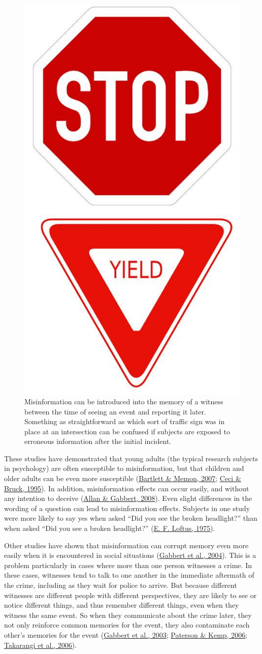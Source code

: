 \documentclass[
]{krantz}
\begin{document}
\begin{figure}

{\centering \includegraphics[width=0.3\linewidth]{images/ch6/fig2} 

}

\caption{Misinformation can be introduced into the memory of a witness between the time of seeing an event and reporting it later. Something as straightforward as which sort of traffic sign was in place at an intersection can be confused if subjects are exposed to erroneous information after the initial incident.}\label{fig:trafficsign}
\end{figure}

These studies have demonstrated that young adults (the typical research subjects in psychology) are often susceptible to misinformation, but that children and older adults can be even more susceptible (\protect\hyperlink{ref-bartlett2007eyewitness}{Bartlett \& Memon, 2007}; \protect\hyperlink{ref-ceci1995jeopardy}{Ceci \& Bruck, 1995}). In addition, misinformation effects can occur easily, and without any intention to deceive (\protect\hyperlink{ref-allan2008still}{Allan \& Gabbert, 2008}). Even slight differences in the wording of a question can lead to misinformation effects. Subjects in one study were more likely to say yes when asked ``Did you see the broken headlight?'' than when asked ``Did you see a broken headlight?'' (\protect\hyperlink{ref-loftus1975leading}{E. F. Loftus, 1975}).

Other studies have shown that misinformation can corrupt memory even more easily when it is encountered in social situations (\protect\hyperlink{ref-gabbert2004say}{Gabbert et al., 2004}). This is a problem particularly in cases where more than one person witnesses a crime. In these cases, witnesses tend to talk to one another in the immediate aftermath of the crime, including as they wait for police to arrive. But because different witnesses are different people with different perspectives, they are likely to see or notice different things, and thus remember different things, even when they witness the same event. So when they communicate about the crime later, they not only reinforce common memories for the event, they also contaminate each other's memories for the event (\protect\hyperlink{ref-gabbert2003memory}{Gabbert et al., 2003}; \protect\hyperlink{ref-paterson2006co}{Paterson \& Kemp, 2006}; \protect\hyperlink{ref-takarangi2006modernising}{Takarangi et al., 2006}).
\end{document}
